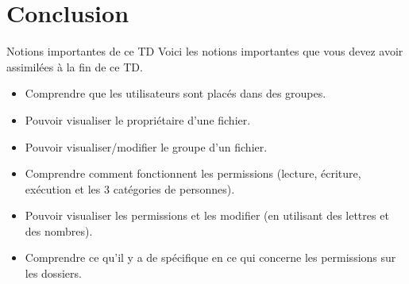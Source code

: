 \documentclass[a4paper,11pt]{style-esi/td}
\begin{document}
\section{Conclusion}

	\begin{theorie}{Notions importantes de ce TD}
		Voici les notions importantes que vous devez avoir assimilées à la fin de ce TD.
		\begin{itemize}
		\item 
			Comprendre que les utilisateurs sont placés dans des groupes.
		\item 
			Pouvoir visualiser le propriétaire d'une fichier.
		\item 
			Pouvoir visualiser/modifier le groupe d'un fichier.
		\item 
			Comprendre comment fonctionnent les permissions
			(lecture, écriture, exécution et les 3 catégories de personnes).
		\item 
			Pouvoir visualiser les permissions
			et les modifier (en utilisant des lettres et des nombres).
		\item 
			Comprendre ce qu'il y a de spécifique en ce qui concerne les permissions
			sur les dossiers.
		\end{itemize}
	\end{theorie}
\end{document}
